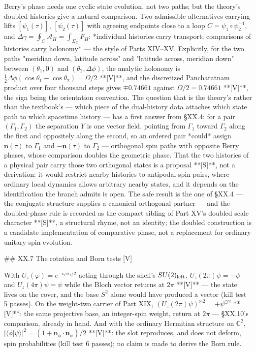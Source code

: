Berry's phase needs one cyclic state evolution, not two paths; but the theory's doubled histories give a natural comparison. Two admissible alternatives carrying lifts $[\psi_1(\tau)]$, $[\psi_2(\tau)]$ with agreeing endpoints close to a loop $C = \psi_1\circ\psi_2^{-1}$, and $\Delta\gamma = \oint_C\mathcal A_H = \int_{\Sigma_C}F_H$: *individual histories carry transport; comparisons of histories carry holonomy* — the style of Parts XIV–XV. Explicitly, for the two paths "meridian down, latitude across" and "latitude across, meridian down" between $(\theta_1,0)$ and $(\theta_2,\Delta\phi)$, the analytic holonomy is $\tfrac12\Delta\phi(\cos\theta_1-\cos\theta_2) = \Omega/2$ **[V]**, and the discretized Pancharatnam product over four thousand steps gives $\mp0.74661$ against $\Omega/2 = 0.74661$ **[V]**, the sign being the orientation convention. The question that is the theory's rather than the textbook's — which piece of the dual-history data attaches which state path to which spacetime history — has a first answer from §XX.4: for a pair $(\Gamma_1,\Gamma_2)$ the separation $Y$ is one vector field, pointing from $\Gamma_1$ toward $\Gamma_2$ along the first and oppositely along the second, so an ordered pair *could* assign $\mathbf n(\tau)$ to $\Gamma_1$ and $-\mathbf n(\tau)$ to $\Gamma_2$ — orthogonal spin paths with opposite Berry phases, whose comparison doubles the geometric phase. That the two histories of a physical pair carry those two orthogonal states is a proposal **[S]**, not a derivation: it would restrict nearby histories to antipodal spin pairs, where ordinary local dynamics allows arbitrary nearby states, and it depends on the identification the branch admits is open. The safe result is the one of §XX.4 — the conjugate structure supplies a canonical orthogonal partner — and the doubled-phase rule is recorded as the compact sibling of Part XV's doubled scale character **[S]**, a structural rhyme, not an identity; the doubled construction is a candidate implementation of comparative phase, not a replacement for ordinary unitary spin evolution.

## XX.7 The rotation and Born tests [V]

With $U_z(\varphi) = e^{-i\varphi\sigma_z/2}$ acting through the shell's $SU(2)_{\rm left}$, $U_z(2\pi)\psi = -\psi$ and $U_z(4\pi)\psi = \psi$ while the Bloch vector returns at $2\pi$ **[V]** — the state lives on the cover, and the base $S^2$ alone would have produced a vector (kill test 5 passes). On the weight-two carrier of Part XIX, $(U_z(2\pi)\psi)^{\odot2} = +\psi^{\odot2}$ **[V]**: the same projective base, an integer-spin weight, return at $2\pi$ — §XX.10's comparison, already in hand. And with the ordinary Hermitian structure on $\mathbb C^2$, $|\langle\phi|\psi\rangle|^2 = (1+\mathbf n_\phi\cdot\mathbf n_\psi)/2$ **[V]**: the slot reproduces, and does not deform, spin probabilities (kill test 6 passes); no claim is made to derive the Born rule.

